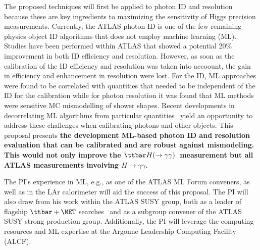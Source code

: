 \documentclass[letter, USenglish, 11pt, subfigure]{article}
\newcommand{\tthyy}{\ensuremath{\ttbar H(\to\gamma\gamma)}}
\begin{document}
The proposed techniques will first be applied to photon ID and resolution because these are key ingredients to maximizing the sensitivity of Higgs precision measurements. Currently, the ATLAS photon ID is one of the few remaining physics object ID algorithms that does not employ machine learning (ML). Studies have been performed within ATLAS that showed a potential 20\% improvement in both ID efficiency and resolution. However, as soon as the calibration of the ID efficiency and resolution was taken into accoount, the gain in efficiency and enhancement in resolution were lost. For the ID, ML approaches were found to be correlated with quantities that needed to be independent of the ID for the calibration while for photon resolution it was found that ML methods were sensitive MC mismodelling of shower shapes. Recent developments in decorrelating ML algorithms from particular quantities~\cite{PhysRevLett.125.122001,louppe2017learning} yield an opportunity to address these challenges when calibrating photons and other objects. This proposal presents {\bf the development ML-based photon ID and resolution evaluation that can be calibrated and are robust against mismodeling. This would not only improve the \tthyy\ measurement but all ATLAS measurements involving $H\to\gamma\gamma$.}

The PI's experience in ML, e.g., as one of the ATLAS ML Forum conveners, as well as in the LAr calorimeter will aid the success of this proposal. The PI will also draw from his work within the ATLAS SUSY group, both as a leader of flagship $\ttbar+\MET$ searches~\cite{stop0L_1,stopRun1,stop0L_2,stop0L_3} and as a subgroup convener of the ATLAS SUSY strong production group. Additionally, the PI will leverage the computing resources and ML expertise at the Argonne Leadership Computing Facility (ALCF).
\end{document}
